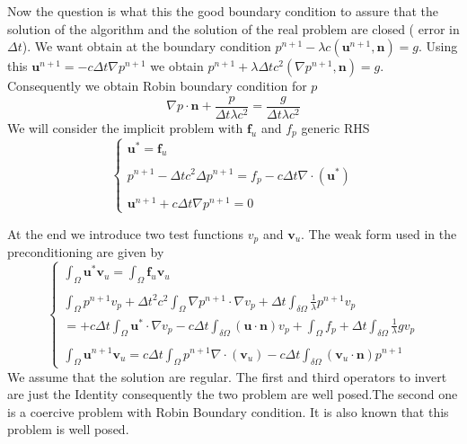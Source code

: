 \documentclass[a4paper,twoside,french,english,11pt]{article}
\newcommand{\ds}{\displaystyle}
\begin{document}
Now the question is what this the good boundary condition to assure that the solution of the algorithm and the solution of the real problem are closed ( error in $\Delta t$). We want obtain at the boundary condition
$p^{n+1}-\lambda c (\bm{u}^{n+1},\bm{n})=g$. Using this $\bm{u}^{n+1}=-c \Delta t\nabla p^{n+1}$ we obtain $p^{n+1}+\lambda  \Delta t c^2 (\nabla p^{n+1},\bm{n})=g$. Consequently we obtain Robin boundary condition for $p$
$$
\nabla p\cdot \bm{n}+\frac{p}{\Delta t\lambda c^2}=\frac{g}{\Delta t\lambda c^2 }
$$
We will consider the implicit problem with $\mathbf{f}_u$ and $f_p$ generic RHS
$$
\left\{\begin{array}{l}
\ds \bm{u}^{*}= \mathbf{f}_u\\
~\\
\ds p^{n+1}- \Delta t c^2\Delta p^{n+1} = f_p-c\Delta t\nabla \cdot (\bm{u}^*) \\
~\\
\ds \bm{u}^{n+1}+c\Delta t\nabla p^{n+1} = 0 \end{array}\right.
$$


At the end we introduce two test functions $v_p$ and $\mathbf{v}_u$. The weak form used in the preconditioning are given by
$$\left\{\begin{array}{l}
\ds \int_{\Omega} \bm{u}^{*} \mathbf{v}_u = \int_{\Omega}\mathbf{f}_u \mathbf{v}_u\\
~\\
\ds \int_{\Omega} p^{n+1} v_p+ \Delta t^2 c^2 \int_{\Omega}\nabla p^{n+1} \cdot \nabla v_p +\Delta t \int_{\delta \Omega} \frac{1}{\lambda }p^{n+1} v_p\\
= \ds +c\Delta t\int_{\Omega} \bm{u}^* \cdot \nabla v_p -c\Delta t \int_{\delta \Omega} (\bm{u}\cdot\bm{n})v_p + \int_{\Omega}f_p+\Delta t \int_{\delta \Omega} \frac{1}{\lambda }g v_p\\
~\\
\ds \int_{\Omega} \bm{u}^{n+1} \mathbf{v}_u= c\Delta t \int_{\Omega} p^{n+1} \nabla \cdot (\mathbf{v}_u)-c\Delta t \int_{\delta \Omega} (\bm{v}_u\cdot\bm{n})p^{n+1}  \end{array}\right.
$$
We assume that the solution are regular. The first and third operators to invert are just the Identity consequently the two problem are well posed.The second one is a coercive problem with Robin Boundary condition. It is also known that this problem is well posed.
\end{document}
